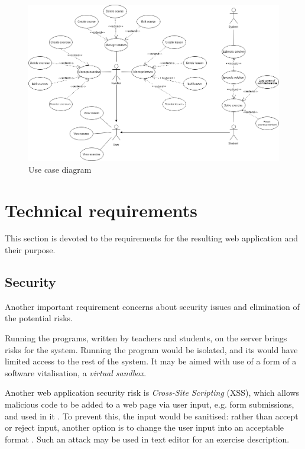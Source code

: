     \begin{figure}
    \centerline{
        \includegraphics[width=\textwidth]
        {images/use-case.png}}
    \caption{Use case diagram}
    \label{fig:use-case}
    \end{figure}

    \section{Technical requirements}
    \label{sec:tech-requirements}
    This section is devoted to the requirements for the resulting web application and their purpose.
        
        \subsection{Security}
        \label{subsec:security}
        Another important requirement concerns about security issues and elimination of the potential risks.
        
        Running the programs, written by teachers and students, on the server brings risks for the system. Running the program would be isolated, and its would have limited access to the rest of the system. It may be aimed with use of a form of a software vitalisation, a \textit{virtual sandbox}.
        
        Another web application security risk is \textit{Cross-Site Scripting} (XSS), which allows malicious code to be added to a web page via user input, e.g. form submissions, and used in it \cite[A7-Cross-Site Scripting (XSS)]{owasp_xss}. To prevent this, the input would be sanitised: rather than accept or reject input, another option is to change the user input into an acceptable format \cite[Sanitize]{owasp_sanitize}. Such an attack may be used in text editor for an exercise description.
